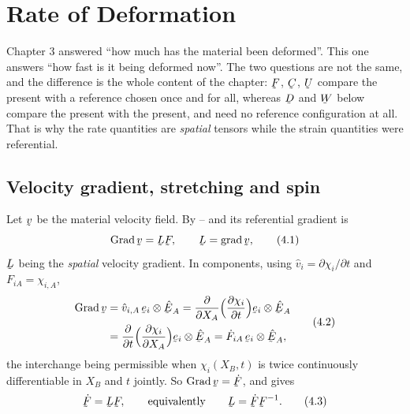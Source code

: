 \chapter{Rate of Deformation}

Chapter 3 answered ``how much has the material been deformed''. This one
answers ``how fast is it being deformed now''. The two questions are not
the same, and the difference is the whole content of the chapter: $\bF$,
$\bC$, $\bU$ compare the present with a reference chosen once and for all,
whereas $\bD$ and $\bW$ below compare the present with the present, and
need no reference configuration at all. That is why the rate quantities
are \emph{spatial} tensors while the strain quantities were referential.

\section{Velocity gradient, stretching and spin}\label{sec:Lstretch}

Let $\bv$ be the material velocity field. By -- and
 its referential gradient is
\begin{equation}
   \Grad\bv=\bL\bF,\qquad \bL=\grad\bv ,
   \tag{4.1}\label{eq:4.1}
\end{equation}
$\bL$ being the \emph{spatial} velocity gradient. In components, using
$\hat v_{i}=\partial\chi_{i}/\partial t$ and $F_{iA}=\chi_{i,A}$,
\begin{equation}
\begin{aligned}
   \Grad\bv&=\hat v_{i,A}\,\be_{i}\otimes\hbE_{A}
   =\frac{\partial}{\partial X_{A}}
     \Big(\frac{\partial\chi_{i}}{\partial t}\Big)\be_{i}\otimes\hbE_{A}\\
   &=\frac{\partial}{\partial t}
     \Big(\frac{\partial\chi_{i}}{\partial X_{A}}\Big)\be_{i}\otimes\hbE_{A}
   =\dot F_{iA}\,\be_{i}\otimes\hbE_{A},
\end{aligned}
   \tag{4.2}\label{eq:4.2}
\end{equation}
the interchange being permissible when $\chi_{i}(X_{B},t)$ is twice
continuously differentiable in $X_{B}$ and $t$ jointly. So
$\Grad\bv=\dot\bF$, and  gives
\begin{equation}
   \dot\bF=\bL\bF,\qquad\text{equivalently}\qquad \bL=\dot\bF\bF^{-1}.
   \tag{4.3}\label{eq:4.3}
\end{equation}

